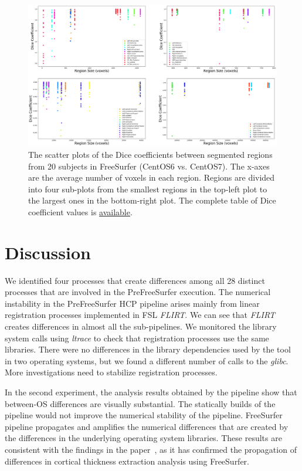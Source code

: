 \documentclass[a4paper,num-refs]{oup-contemporary}
\begin{document}
\begin{figure}
  \centering
    \includegraphics[width=\textwidth]{images/scatter_plot.png} 
    \caption{The scatter plots of the Dice coefficients between segmented regions 
            from 20 subjects in FreeSurfer (CentOS6 vs. CentOS7). 
            The x-axes are the average number of voxels in each region.
            Regions are divided into four sub-plots from the smallest regions in the top-left plot 
            to the largest ones in the bottom-right plot.
            The complete table of Dice coefficient values is 
            \href{https://github.com/ali4006/HCP-reproducibility-paper/blob/master/data/dice_values.csv}
            {available}.} 
    \label{fig:scatter_plot}
  \end{figure}


\section{Discussion}

We identified four processes that create differences 
among all 28 distinct processes that are involved in the PreFreeSurfer execution. 
The numerical instability in the 
PreFreeSurfer HCP pipeline arises mainly from linear 
registration processes implemented in FSL \emph{FLIRT}. 
We can see that \emph{FLIRT} creates differences in almost all the sub-pipelines. 
We monitored the library system calls using \emph{ltrace} to check that registration processes
use the same libraries. There were no differences in the library dependencies used by 
the tool in two operating systems, but we found a different number of calls to the \emph{glibc}.
More investigations need to stabilize registration processes.


In the second experiment, 
the analysis results obtained by the pipeline show that between-OS differences are visually substantial.
The statically builds of the pipeline would not improve the numerical stability of the pipeline. 
FreeSurfer pipeline propagates and amplifies the numerical differences that are created by the 
differences in the underlying operating system libraries.
These results are consistent with the findings in the paper~\cite{Glatard2015}, 
as it has confirmed the propagation of differences in cortical thickness extraction analysis using FreeSurfer.
\end{document}
